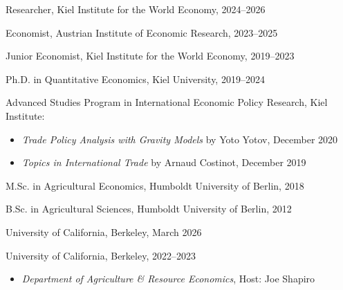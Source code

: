 \documentclass{article}
\newlength{\cvlabelwidth}\setlength{\cvlabelwidth}{0.12\textwidth}
\newlength{\cvlabelgap}\setlength{\cvlabelgap}{5mm}
\newcommand{\cvmakelabel}[1]{%
    \smash{\parbox[t]{\cvlabelwidth}{\raggedright{\fontfamily{phv}\selectfont #1}}}}
\newenvironment{cvsection}[1]{%
    \par\medskip
    \begin{list}{}{%
        \setlength{\leftmargin}{\dimexpr\cvlabelwidth+\cvlabelgap\relax}%
        \setlength{\labelwidth}{\cvlabelwidth}%
        \setlength{\labelsep}{\cvlabelgap}%
        \setlength{\rightmargin}{0pt}%
        \setlength{\itemindent}{0pt}%
        \setlength{\listparindent}{0pt}%
        \setlength{\topsep}{0pt}%
        \setlength{\partopsep}{0pt}%
        \setlength{\parsep}{0.3em}%
        \setlength{\itemsep}{0pt}%
        \let\makelabel\cvmakelabel%
    }%
    \item[#1]\ignorespaces%
}{%
    \end{list}\medskip%
}
\begin{document}

\begin{cvsection}{PREVIOUS POSITION}
    Researcher, Kiel Institute for the World Economy, 2024--2026 \par
    Economist, Austrian Institute of Economic Research,  2023--2025 \par
    Junior Economist, Kiel Institute for the World Economy, 2019--2023 \par
\end{cvsection}


\begin{cvsection}{EDUCATION}
    Ph.D. in Quantitative Economics, Kiel University, 2019--2024 \par
    Advanced Studies Program in International Economic Policy Research, Kiel Institute:
    \begin{itemize}
        \item[-] \textit{Trade Policy Analysis with Gravity Models} by Yoto Yotov, December 2020 
        \item[-] \textit{Topics in International Trade} by Arnaud Costinot, December 2019
    \end{itemize}
    M.Sc. in Agricultural Economics, Humboldt University of Berlin, 2018 \par
    B.Sc. in Agricultural Sciences, Humboldt University of Berlin, 2012 \par
\end{cvsection}


\begin{cvsection}{RESEARCH VISITS}
    University of California, Berkeley, March 2026 \par
    University of California, Berkeley, 2022--2023 \par
    \begin{itemize}
        \item[-] \textit{Department of Agriculture \& Resource Economics}, Host: Joe Shapiro
    \end{itemize}
\end{cvsection}

\end{document}
